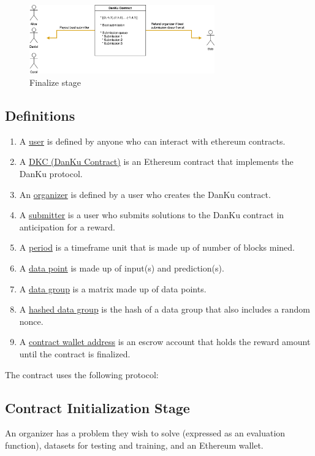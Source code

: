\documentclass{article}
\begin{document}
\begin{figure}[h]
\caption{Finalize stage}
\includegraphics[width=8cm]{protocol_finalize}
\end{figure}

\subsection{Definitions}

\begin{enumerate}
    \item A \underline{user} is defined by anyone who can interact with ethereum contracts.
    \item A \underline{DKC (DanKu Contract)} is an Ethereum contract that implements the DanKu protocol.
    \item An \underline{organizer} is defined by a user who creates the DanKu contract.
    \item A \underline{submitter} is a user who submits solutions to the DanKu contract in anticipation for a reward.
    \item A \underline{period} is a timeframe unit that is made up of number of blocks mined.
    \item A \underline{data point} is made up of input(s) and prediction(s).
    \item A \underline{data group} is a matrix made up of data points.
    \item A \underline{hashed data group} is the hash of a data group that also includes a random nonce.
    \item A \underline{contract wallet address} is an escrow account that holds the reward amount until the contract is finalized.
\end{enumerate}

The contract uses the following protocol:

\subsection{Contract Initialization Stage}

An organizer has a problem they wish to solve (expressed as an evaluation function), datasets for testing and training, and an Ethereum wallet.
\end{document}
